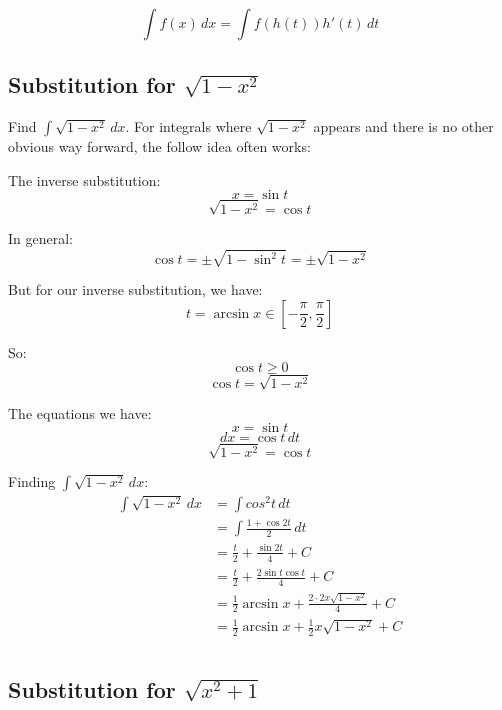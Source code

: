 \documentclass[11pt]{article}
\begin{document}
\[\int f(x) \, dx = \int f(h(t)) h'(t) \, dt\]
\subsection{Substitution for \(\sqrt{1 - x^2}\)}
\label{sec:orgac7ee1a}
Find \(\int \sqrt{1 - x^2} \, dx\). For integrals where \(\sqrt{1 - x^2}\) appears and there is no other obvious way forward, the follow idea often works:

\begin{center}
\end{center}

The inverse substitution:
\[x = \sin t\]
\[\sqrt{1 - x^2} = \cos t\]

In general:
\[\cos t = \pm \sqrt{1 - \sin^2 t} = \pm \sqrt{1 - x^2}\]

But for our inverse substitution, we have:
\[t = \arcsin x \in \left[- \frac{\pi}{2}, \frac{\pi}{2} \right]\]

So:
\[\cos t \ge 0\]
\[\cos t = \sqrt{1 - x^2}\]

The equations we have:
\[x = \sin t\]
\[dx = \cos t \, dt\]
\[\sqrt{1 - x^2} = \cos t\]

Finding \(\int \sqrt{1 - x^2} \, dx\):
\begin{align*}
\int \sqrt{1 - x^2} \, dx &= \int cos^2 t \, dt \\
&= \int \frac{1 + \cos 2t}{2} \, dt \\
&= \frac{t}{2} + \frac{\sin 2t}{4} + C \\
&= \frac{t}{2} + \frac{2 \sin t \cos t}{4} + C \\
&= \frac{1}{2} \arcsin x + \frac{2 \cdot 2x \sqrt{1 - x^2}}{4} + C \\
&= \frac{1}{2} \arcsin x + \frac{1}{2}x \sqrt{1 - x^2} + C \\
\end{align*}

\newpage
\subsection{Substitution for \(\sqrt{x^2 + 1}\)}
\label{sec:org4510a58}
\end{document}
